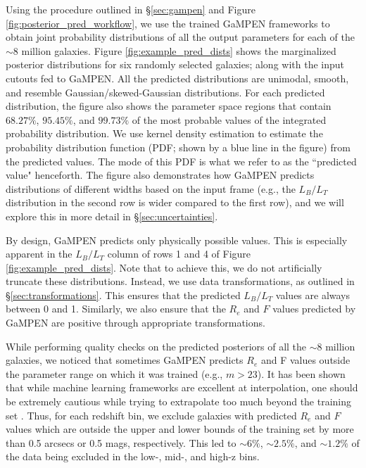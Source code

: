\documentclass[linenumbers,twocolumn,twocolappendix]{aastex631}
\newcommand\gampen{GaMPEN}
\begin{document}
\begin{CJK*}{UTF8}{gbsn}
Using the procedure outlined in \S \ref{sec:gampen} and Figure \ref{fig:posterior_pred_workflow}, we use the trained \gampen{} frameworks to obtain joint probability distributions of all the output parameters for each of the $\sim 8$ million galaxies. Figure \ref{fig:example_pred_dists} shows the marginalized posterior distributions for six randomly selected galaxies; along with the input cutouts fed to \gampen{}. All the predicted distributions are unimodal, smooth, and resemble Gaussian/skewed-Gaussian distributions. For each predicted distribution, the figure also shows the parameter space regions that contain $68.27\%$, $95.45\%$, and $99.73\%$ of the most probable values of the integrated probability distribution. We use kernel density estimation to estimate the probability distribution function (PDF; shown by a blue line in the figure) from the predicted values. The mode of this PDF is what we refer to as the ``predicted value" henceforth. The figure also demonstrates how \gampen{} predicts distributions of different widths based on the input frame (e.g., the $L_B/L_T$ distribution in the second row is wider compared to the first row), and we will explore this in more detail in \S \ref{sec:uncertainties}. 

By design, \gampen{} predicts only physically possible values. This is especially apparent in the $L_B/L_T$ column of rows 1 and 4 of Figure \ref{fig:example_pred_dists}. Note that to achieve this, we do not artificially truncate these distributions. Instead, we use data transformations, as outlined in \S \ref{sec:transformations}. This ensures that the predicted $L_B/L_T$ values are always between 0 and 1. Similarly, we also ensure  that the $R_e$ and $F$ values predicted by \gampen{} are positive through appropriate transformations. 

While performing quality checks on the predicted posteriors of all the $\sim 8$ million galaxies, we noticed that sometimes \gampen{} predicts $R_e$ and F values outside the parameter range on which it was trained (e.g., $m > 23$). It has been shown that while machine learning frameworks are excellent at interpolation, one should be extremely cautious while trying to extrapolate too much beyond the training set \citep[e.g.,][]{candela_09, recht_19, taori_20}. Thus, for each redshift bin, we exclude galaxies with predicted $R_e$ and $F$ values which are outside the upper and lower bounds of the training set by more than 0.5 arcsecs or 0.5 mags, respectively. This led to $\sim6\%$, $\sim2.5\%$, and $\sim1.2\%$ of the data being excluded in the low-, mid-, and high-z bins.


\end{CJK*}
\end{document}
